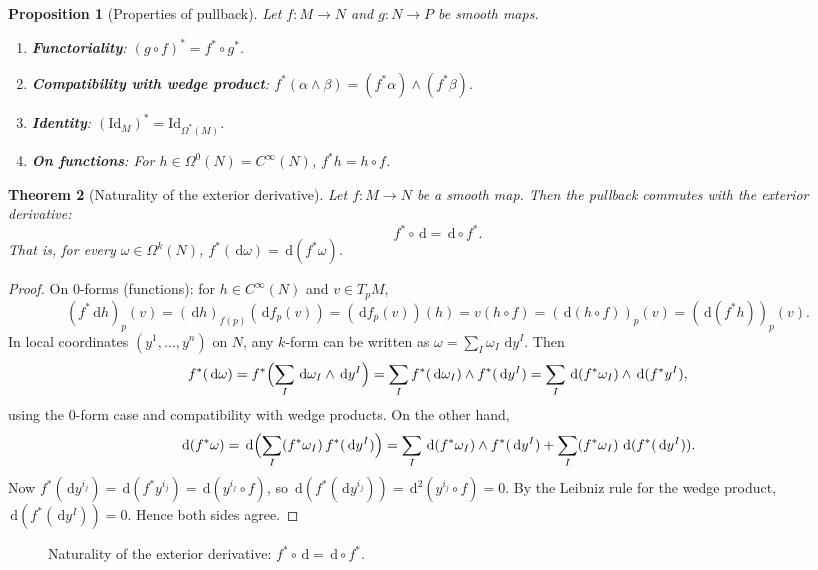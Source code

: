 \documentclass[12pt,a4paper,openany]{book}
\newtheorem{theorem}{Theorem}[section]
\newtheorem{proposition}[theorem]{Proposition}
\theoremstyle{definition}
\theoremstyle{remark}
\newcommand{\Id}{\mathrm{Id}}
\newcommand{\dd}{\,\mathrm{d}}
\begin{document}
\begin{proposition}[Properties of pullback]\label{prop:pullback-properties}
Let $f \colon M \to N$ and $g \colon N \to P$ be smooth maps.
\begin{enumerate}[label=(\roman*)]
  \item \textbf{Functoriality}: $(g \circ f)^* = f^* \circ g^*$.
  \item \textbf{Compatibility with wedge product}:
    $f^*(\alpha \wedge \beta) = (f^*\alpha) \wedge (f^*\beta)$.
  \item \textbf{Identity}: $(\Id_M)^* = \Id_{\Omega^*(M)}$.
  \item \textbf{On functions}: For $h \in \Omega^0(N) = C^\infty(N)$,
    $f^* h = h \circ f$.
\end{enumerate}
\end{proposition}

\begin{theorem}[Naturality of the exterior derivative]\label{thm:naturality-d}
\index{naturality of $\dd$}
Let $f \colon M \to N$ be a smooth map. Then the pullback commutes with the
exterior derivative:
\[
  f^* \circ \dd = \dd \circ f^*.
\]
That is, for every $\omega \in \Omega^k(N)$,
$f^*(\dd\omega) = \dd(f^*\omega)$.
\end{theorem}

\begin{proof}
On $0$-forms (functions): for $h \in C^\infty(N)$ and $v \in T_p M$,
\[
  (f^*\dd h)_p(v) = (\dd h)_{f(p)}(\dd f_p(v))
  = (\dd f_p(v))(h)
  = v(h \circ f)
  = (\dd(h \circ f))_p(v)
  = (\dd(f^*h))_p(v).
\]
In local coordinates $(y^1, \ldots, y^n)$ on $N$, any $k$-form can be
written as $\omega = \sum_I \omega_I\, \dd y^I$. Then
\[
  f^*(\dd\omega) = f^*\Bigl(\sum_I \dd\omega_I \wedge \dd y^I\Bigr)
  = \sum_I f^*(\dd\omega_I) \wedge f^*(\dd y^I)
  = \sum_I \dd(f^*\omega_I) \wedge \dd(f^*y^I),
\]
using the $0$-form case and compatibility with wedge products. On the other
hand,
\[
  \dd(f^*\omega) = \dd\Bigl(\sum_I (f^*\omega_I)\, f^*(\dd y^I)\Bigr)
  = \sum_I \dd(f^*\omega_I) \wedge f^*(\dd y^I)
    + \sum_I (f^*\omega_I)\, \dd(f^*(\dd y^I)).
\]
Now $f^*(\dd y^{i_j}) = \dd(f^* y^{i_j}) = \dd(y^{i_j} \circ f)$, so
$\dd(f^*(\dd y^{i_j})) = \dd^2(y^{i_j} \circ f) = 0$. By the Leibniz rule
for the wedge product, $\dd(f^*(\dd y^I)) = 0$. Hence both sides agree.
\end{proof}

\begin{figure}[ht]
\centering
{}
\caption{Naturality of the exterior derivative: $f^* \circ \dd = \dd \circ f^*$.}
\label{fig:naturality-d}
\end{figure}
\end{document}
